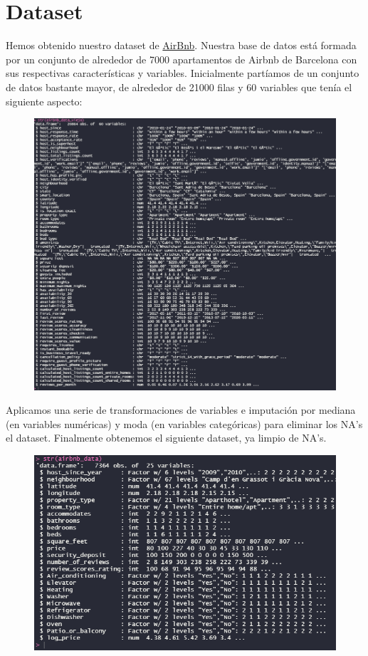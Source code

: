\documentclass{article}
\begin{document}
\section{Dataset}
Hemos obtenido nuestro dataset de \href{http://insideairbnb.com/get-the-data.html}{AirBnb}. Nuestra base de datos está formada por un conjunto de alrededor de 7000 apartamentos de Airbnb de Barcelona con sus respectivas características y variables. Inicialmente partíamos de un conjunto de datos bastante mayor, de alrededor de 21000 filas y 60 variables que tenía el siguiente aspecto:
\vspace{0.45cm}
\begin{figure}[h]
\hspace*{-0.25cm}
\centering
\includegraphics[scale = 0.6]{airbnb_data_viejo}
\end{figure}

\clearpage
Aplicamos una serie de transformaciones de variables e imputación por mediana (en variables numéricas) y moda (en variables categóricas) para eliminar los NA's el dataset. Finalmente obtenemos el siguiente dataset, ya limpio de NA's.
\vspace{0.45cm}
\begin{figure}[h]
\hspace*{-0.25cm}
\centering
\includegraphics[scale = 0.7]{str_despues}
\end{figure}
\end{document}
